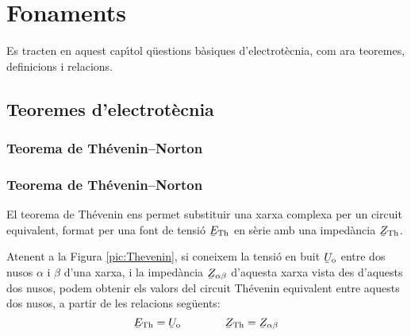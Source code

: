 \chapter{Fonaments}

Es tracten en aquest cap\'{\i}tol q\"{u}estions b\`{a}siques d'electrot\`{e}cnia, com ara teoremes, definicions
i relacions.

\section{Teoremes d'electrot\`{e}cnia}

\ifpdf
    \subsection{\texorpdfstring{Teorema de Th\'{e}venin--Norton}{Teorema de
    Th\'{e}venin-Norton}}\label{sec:thev-norton}
\else
    \subsection{Teorema de Th\'{e}venin--Norton}
\fi
\label{sec:T_N}

El teorema de Th\'{e}venin ens permet substituir una xarxa complexa per un circuit equivalent, format per una font de tensi\'{o} $\cmplx{E}\ped{Th}$ en s\`{e}rie amb una imped\`{a}ncia $\cmplx{Z}\ped{Th}$.

Atenent a la Figura \vref{pic:Thevenin}, si coneixem la tensi\'{o} en
buit $\cmplx{U}\ped{o}$ entre dos nusos $\alpha$ i $\beta$ d'una
xarxa, i la imped\`{a}ncia $\cmplx{Z}_{\alpha\beta}$ d'aquesta xarxa
vista des d'aquests dos nusos, podem obtenir els valors del circuit
Th\'{e}venin equivalent entre aquests dos nusos, a partir de les
relacions seg\"{u}ents:
\begin{equation}
   \cmplx{E}\ped{Th} = \cmplx{U}\ped{o} \qquad\qquad  \cmplx{Z}\ped{Th} = \cmplx{Z}_{\alpha\beta}
\end{equation}

